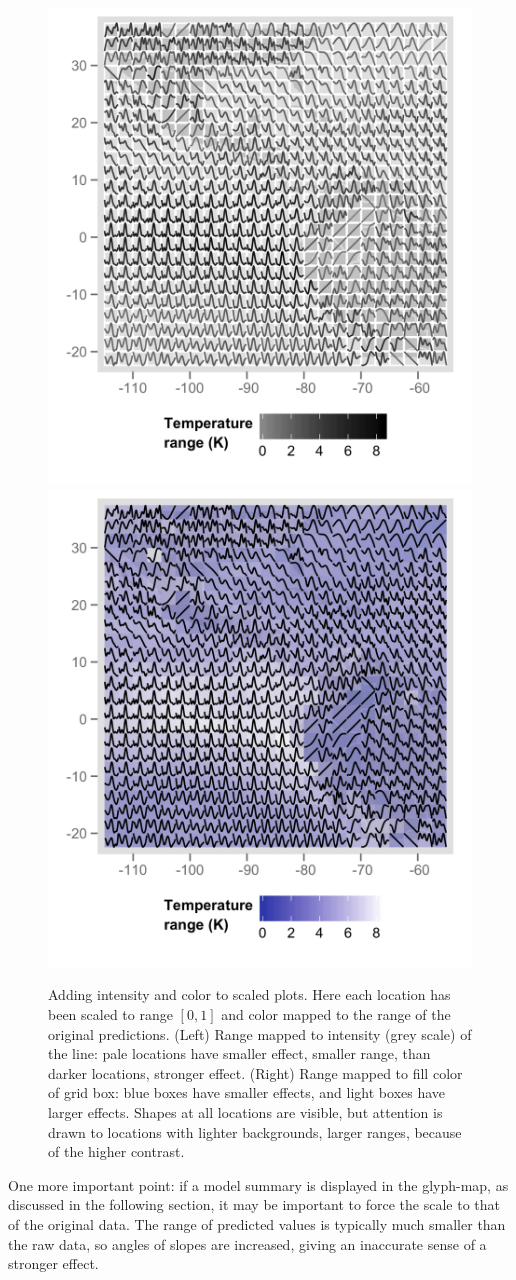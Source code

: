\documentclass[oneside]{article}
\begin{document}
\begin{figure}[htbp]
 \centering
 \includegraphics[width=0.5\linewidth]{month-rescale01-col}%
 \includegraphics[width=0.5\linewidth]{month-rescale01-fill}
 \caption{Adding intensity and color to scaled plots. Here each location has been scaled to range $[0, 1]$ and color mapped to the range of the original predictions. (Left) Range mapped to intensity (grey scale) of the line: pale locations have smaller effect, smaller range, than darker locations, stronger effect. (Right) Range mapped to fill color of grid box: blue boxes have smaller effects, and light boxes have larger effects. Shapes at all locations are visible, but attention is drawn to locations with lighter backgrounds, larger ranges, because of the higher contrast.}
 \label{fig:scaling-col}
\end{figure}

One more important point: if a model summary is displayed in the glyph-map, as discussed in the following section, it may be important to force the scale to that of the original data. The range of predicted values is typically much smaller than the raw data, so angles of slopes are increased, giving an inaccurate sense of a stronger effect.  
\end{document}
